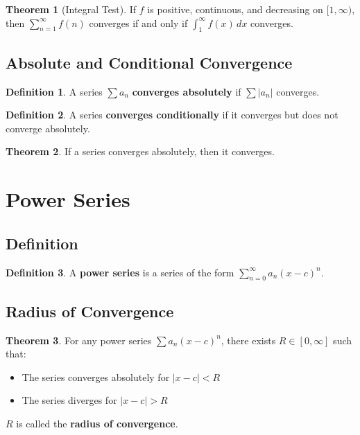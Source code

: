 \documentclass[11pt]{article}
\theoremstyle{definition}
\newtheorem{definition}{Definition}[section]
\newtheorem{theorem}{Theorem}[section]
\begin{document}
\begin{theorem}[Integral Test]
If $f$ is positive, continuous, and decreasing on $[1,\infty)$, then $\sum_{n=1}^{\infty} f(n)$ converges if and only if $\int_1^{\infty} f(x) \, dx$ converges.
\end{theorem}

\subsection{Absolute and Conditional Convergence}
\begin{definition}
A series $\sum a_n$ \textbf{converges absolutely} if $\sum |a_n|$ converges.
\end{definition}

\begin{definition}
A series \textbf{converges conditionally} if it converges but does not converge absolutely.
\end{definition}

\begin{theorem}
If a series converges absolutely, then it converges.
\end{theorem}

\section{Power Series}

\subsection{Definition}
\begin{definition}
A \textbf{power series} is a series of the form $\sum_{n=0}^{\infty} a_n (x-c)^n$.
\end{definition}

\subsection{Radius of Convergence}
\begin{theorem}
For any power series $\sum a_n (x-c)^n$, there exists $R \in [0,\infty]$ such that:
\begin{itemize}
    \item The series converges absolutely for $|x-c| < R$
    \item The series diverges for $|x-c| > R$
\end{itemize}
$R$ is called the \textbf{radius of convergence}.
\end{theorem}
\end{document}

